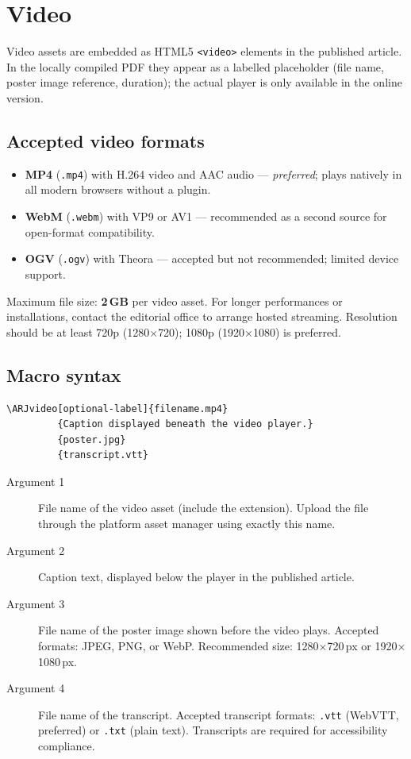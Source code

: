 \section{Video}

Video assets are embedded as HTML5 \texttt{<video>} elements in the
published article. In the locally compiled PDF they appear as a labelled
placeholder (file name, poster image reference, duration); the actual
player is only available in the online version.

\subsection{Accepted video formats}

\begin{itemize}
  \item \textbf{MP4} (\texttt{.mp4}) with H.264 video and AAC audio ---
    \emph{preferred}; plays natively in all modern browsers without a
    plugin.
  \item \textbf{WebM} (\texttt{.webm}) with VP9 or AV1 --- recommended
    as a second source for open-format compatibility.
  \item \textbf{OGV} (\texttt{.ogv}) with Theora --- accepted but not
    recommended; limited device support.
\end{itemize}

Maximum file size: \textbf{2\,GB} per video asset. For longer
performances or installations, contact the editorial office to arrange
hosted streaming. Resolution should be at least 720p (1280$\times$720);
1080p (1920$\times$1080) is preferred.

\subsection{Macro syntax}

\begin{verbatim}
\ARJvideo[optional-label]{filename.mp4}
         {Caption displayed beneath the video player.}
         {poster.jpg}
         {transcript.vtt}
\end{verbatim}

\begin{description}
  \item[Argument 1] File name of the video asset (include the extension).
    Upload the file through the platform asset manager using exactly this
    name.
  \item[Argument 2] Caption text, displayed below the player in the
    published article.
  \item[Argument 3] File name of the poster image shown before the video
    plays. Accepted formats: JPEG, PNG, or WebP. Recommended size:
    1280$\times$720\,px or 1920$\times$1080\,px.
  \item[Argument 4] File name of the transcript. Accepted transcript
    formats: \texttt{.vtt} (WebVTT, preferred) or \texttt{.txt}
    (plain text). Transcripts are required for accessibility compliance.
\end{description}

